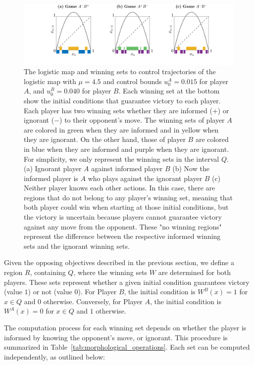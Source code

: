 \begin{figure}[h!]
    \centering
   \includegraphics[trim={3.2cm 0cm 0cm 0cm}, clip,width=1.1\textwidth ]{Images/P5/sets_juego.png}
    \caption{The logistic map and winning sets to control trajectories of the logistic map with $\mu = 4.5$ and control bounds $u^A_0 = 0.015$ for player $A$, and $u^B_0 = 0.040$ for player $B$. Each winning set at the bottom show the initial conditions that guarantee victory to each player. Each player has two winning sets whether they are informed ($+$) or ignorant ($-$) to their opponent's move. The winning sets of player $A$ are colored in green when they are informed and in yellow when they are ignorant. On the other hand, those of player $B$ are colored in blue when they are informed and purple when they are ignorant. For simplicity, we only represent the winning sets in the interval $Q$. (a) Ignorant player $A$ against informed player $B$ (b) Now the informed player is $A$ who plays against the ignorant player $B$ (c) Neither player knows each other actions. In this case, there are regions that do not belong to any player's winning set, meaning that both player could win when starting at those initial conditions, but the victory is uncertain because players cannot guarantee victory against any move from the opponent. These "no winning regions" represent the difference between the respective informed winning sets and the ignorant winning sets.}
    \label{fig::sets}
\end{figure}




Given the opposing objectives described in the previous section, we define a region $R$, containing $Q$, where the winning sets $W$ are determined for both players. These sets represent whether a given initial condition guarantees victory (value $1$) or not (value $0$). For Player $B$, the initial condition is $W^B(x) = 1$ for $x \in Q$ and $0$ otherwise. Conversely, for Player $A$, the initial condition is $W^A(x) = 0$ for $x \in Q$ and $1$ otherwise.  

The computation process for each winning set depends on whether the player is informed by knowing the opponent's move, or ignorant. This procedure is summarized in Table~\ref{tab:morphological_operations}. Each set can be computed independently, as outlined below:  

